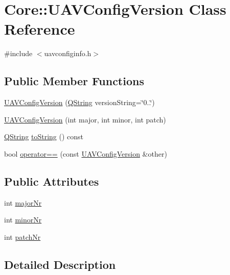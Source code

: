 \hypertarget{class_core_1_1_u_a_v_config_version}{\section{\-Core\-:\-:\-U\-A\-V\-Config\-Version \-Class \-Reference}
\label{class_core_1_1_u_a_v_config_version}
}


{\ttfamily \#include $<$uavconfiginfo.\-h$>$}

\subsection*{\-Public \-Member \-Functions}
\begin{DoxyCompactItemize}
\item 
\hyperlink{group___core_plugin_gaa5e966ca40b0d2dc27736118c62e3b9a}{\-U\-A\-V\-Config\-Version} (\hyperlink{group___u_a_v_objects_plugin_gab9d252f49c333c94a72f97ce3105a32d}{\-Q\-String} version\-String=\char`\"{}0..\char`\"{})
\item 
\hyperlink{group___core_plugin_gae062fee28dd1581628f466c695ada76b}{\-U\-A\-V\-Config\-Version} (int major, int minor, int patch)
\item 
\hyperlink{group___u_a_v_objects_plugin_gab9d252f49c333c94a72f97ce3105a32d}{\-Q\-String} \hyperlink{group___core_plugin_ga2e4d1cb09f2247d7add5cdc77ae8871e}{to\-String} () const 
\item 
bool \hyperlink{group___core_plugin_ga790d498b6af141ce950dc95b6f53d53b}{operator==} (const \hyperlink{class_core_1_1_u_a_v_config_version}{\-U\-A\-V\-Config\-Version} \&other)
\end{DoxyCompactItemize}
\subsection*{\-Public \-Attributes}
\begin{DoxyCompactItemize}
\item 
int \hyperlink{group___core_plugin_gac05539a177a40beac60eda4492f9e8cd}{major\-Nr}
\item 
int \hyperlink{group___core_plugin_gad622c08143c80bf70a137d813062c911}{minor\-Nr}
\item 
int \hyperlink{group___core_plugin_ga990f8dc285c5d4e049ac773ba645d8f2}{patch\-Nr}
\end{DoxyCompactItemize}


\subsection{\-Detailed \-Description}


